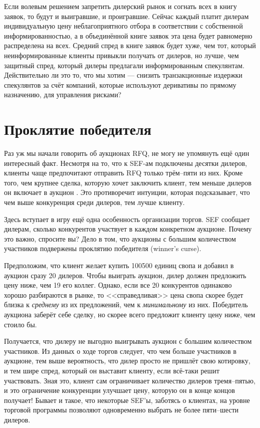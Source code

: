Если волевым решением запретить дилерский рынок и согнать всех в книгу заявок,
то будут и выигравшие, и проигравшие. Сейчас каждый платит дилерам
индивидуальную цену неблагоприятного отбора в соответствии с собственной
информированностью, а в объединённой книге заявок эта цена будет равномерно
распределена на всех. Средний спред в книге заявок будет хуже, чем тот, который
неинформированные клиенты привыкли получать от дилеров, но лучше, чем защитный
спред, который дилеры предлагали информированным спекулянтам. Действительно ли
это то, что мы хотим --- снизить транзакционные издержки спекулянтов за счёт
компаний, которые используют деривативы по прямому назначению, для управления
рисками?

\section*{Проклятие победителя}

Раз уж мы начали говорить об аукционах RFQ, не могу не упомянуть ещё один
интересный факт. Несмотря на то, что к SEF-ам подключены десятки дилеров,
клиенты чаще предпочитают отправить RFQ только трём--пяти из них. Кроме того,
чем крупнее сделка, которую хочет заключить клиент, тем меньше дилеров он
включает в аукцион \cite{riggs2019}. Это противоречит интуиции, которая
подсказывает, что чем выше конкуренция среди дилеров, тем лучше клиенту.

Здесь вступает в игру ещё одна особенность организации торгов. SEF сообщает
дилерам, сколько конкурентов участвует в каждом конкретном аукционе. Почему это
важно, спросите вы? Дело в том, что аукционы с большим количеством участников
подвержены проклятию победителя (winner's curse).

Предположим, что клиент желает купить \num{100500} единиц свопа и добавил в
аукцион сразу 20 дилеров. Чтобы выиграть аукцион, дилер должен предложить цену
ниже, чем 19 его коллег. Однако, если все 20 конкурентов одинаково хорошо
разбираются в рынке, то <<справедливая>> цена свопа скорее будет близка к
\emph{среднему} из их предложений, чем к \emph{минимальному} из них. Победитель
аукциона заберёт себе сделку, но скорее всего предложит клиенту цену ниже, чем
стоило бы.

Получается, что дилеру не выгодно выигрывать аукцион с большим количеством
участников. Из данных о ходе торгов следует, что чем больше участников в
аукционе, тем выше вероятность, что дилер просто не пришлёт свою котировку, и
тем шире спред, который он выставит клиенту, если всё-таки решит участвовать.
Зная это, клиент сам ограничивает количество дилеров тремя--пятью, и это
ограничение конкуренции улучшает цену, которую он в конце концов получает!
Бывает и такое, что некоторые SEF'ы, заботясь о клиентах, на уровне торговой
программы позволяют одновременно выбрать не более пяти--шести дилеров.

